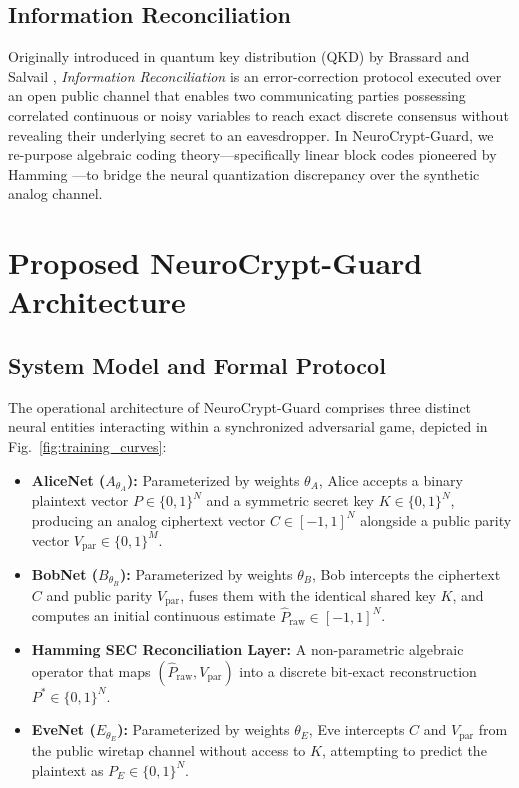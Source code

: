 \documentclass[journal,10pt,twocolumn]{IEEEtran}
\begin{document}
\subsection{Information Reconciliation}
Originally introduced in quantum key distribution (QKD) by Brassard and Salvail \cite{brassard2003secret}, \textit{Information Reconciliation} is an error-correction protocol executed over an open public channel that enables two communicating parties possessing correlated continuous or noisy variables to reach exact discrete consensus without revealing their underlying secret to an eavesdropper. In NeuroCrypt-Guard, we re-purpose algebraic coding theory—specifically linear block codes pioneered by Hamming \cite{hamming1950error}—to bridge the neural quantization discrepancy over the synthetic analog channel.

\section{Proposed NeuroCrypt-Guard Architecture}

\subsection{System Model and Formal Protocol}
The operational architecture of NeuroCrypt-Guard comprises three distinct neural entities interacting within a synchronized adversarial game, depicted in Fig.~\ref{fig:training_curves}:
\begin{itemize}
    \item \textbf{AliceNet ($A_{\theta_A}$):} Parameterized by weights $\theta_A$, Alice accepts a binary plaintext vector $P \in \{0, 1\}^N$ and a symmetric secret key $K \in \{0, 1\}^N$, producing an analog ciphertext vector $C \in [-1, 1]^N$ alongside a public parity vector $V_{\text{par}} \in \{0, 1\}^M$.
    \item \textbf{BobNet ($B_{\theta_B}$):} Parameterized by weights $\theta_B$, Bob intercepts the ciphertext $C$ and public parity $V_{\text{par}}$, fuses them with the identical shared key $K$, and computes an initial continuous estimate $\hat{P}_{\text{raw}} \in [-1, 1]^N$.
    \item \textbf{Hamming SEC Reconciliation Layer:} A non-parametric algebraic operator that maps $(\hat{P}_{\text{raw}}, V_{\text{par}})$ into a discrete bit-exact reconstruction $P^* \in \{0, 1\}^N$.
    \item \textbf{EveNet ($E_{\theta_E}$):} Parameterized by weights $\theta_E$, Eve intercepts $C$ and $V_{\text{par}}$ from the public wiretap channel without access to $K$, attempting to predict the plaintext as $P_E \in \{0, 1\}^N$.
\end{itemize}
\end{document}

